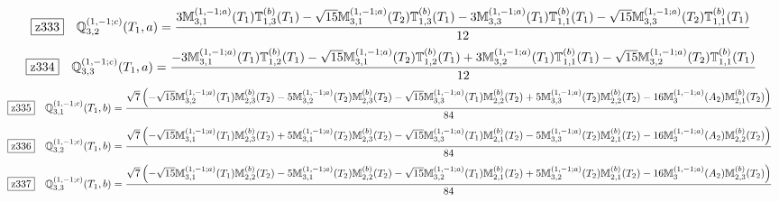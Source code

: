 \documentclass[fleqn,10pt,landscape]{jsarticle}
\begin{document}
\begin{dmath*}
\hspace*{3mm}\fbox{z333}\quad \mathbb{Q}_{3,2}^{(1,-1;c)}(T_{1},a)=\frac{3 \mathbb{M}_{3,1}^{(1,-1;a)}(T_{1}) \mathbb{T}_{1,3}^{(b)}(T_{1}) - \sqrt{15} \mathbb{M}_{3,1}^{(1,-1;a)}(T_{2}) \mathbb{T}_{1,3}^{(b)}(T_{1}) - 3 \mathbb{M}_{3,3}^{(1,-1;a)}(T_{1}) \mathbb{T}_{1,1}^{(b)}(T_{1}) - \sqrt{15} \mathbb{M}_{3,3}^{(1,-1;a)}(T_{2}) \mathbb{T}_{1,1}^{(b)}(T_{1})}{12}
\end{dmath*}
\begin{dmath*}
\hspace*{3mm}\fbox{z334}\quad \mathbb{Q}_{3,3}^{(1,-1;c)}(T_{1},a)=\frac{- 3 \mathbb{M}_{3,1}^{(1,-1;a)}(T_{1}) \mathbb{T}_{1,2}^{(b)}(T_{1}) - \sqrt{15} \mathbb{M}_{3,1}^{(1,-1;a)}(T_{2}) \mathbb{T}_{1,2}^{(b)}(T_{1}) + 3 \mathbb{M}_{3,2}^{(1,-1;a)}(T_{1}) \mathbb{T}_{1,1}^{(b)}(T_{1}) - \sqrt{15} \mathbb{M}_{3,2}^{(1,-1;a)}(T_{2}) \mathbb{T}_{1,1}^{(b)}(T_{1})}{12}
\end{dmath*}
\begin{dmath*}
\hspace*{3mm}\fbox{z335}\quad \mathbb{Q}_{3,1}^{(1,-1;c)}(T_{1},b)=\frac{\sqrt{7} \left(- \sqrt{15} \mathbb{M}_{3,2}^{(1,-1;a)}(T_{1}) \mathbb{M}_{2,3}^{(b)}(T_{2}) - 5 \mathbb{M}_{3,2}^{(1,-1;a)}(T_{2}) \mathbb{M}_{2,3}^{(b)}(T_{2}) - \sqrt{15} \mathbb{M}_{3,3}^{(1,-1;a)}(T_{1}) \mathbb{M}_{2,2}^{(b)}(T_{2}) + 5 \mathbb{M}_{3,3}^{(1,-1;a)}(T_{2}) \mathbb{M}_{2,2}^{(b)}(T_{2}) - 16 \mathbb{M}_{3}^{(1,-1;a)}(A_{2}) \mathbb{M}_{2,1}^{(b)}(T_{2})\right)}{84}
\end{dmath*}
\begin{dmath*}
\hspace*{3mm}\fbox{z336}\quad \mathbb{Q}_{3,2}^{(1,-1;c)}(T_{1},b)=\frac{\sqrt{7} \left(- \sqrt{15} \mathbb{M}_{3,1}^{(1,-1;a)}(T_{1}) \mathbb{M}_{2,3}^{(b)}(T_{2}) + 5 \mathbb{M}_{3,1}^{(1,-1;a)}(T_{2}) \mathbb{M}_{2,3}^{(b)}(T_{2}) - \sqrt{15} \mathbb{M}_{3,3}^{(1,-1;a)}(T_{1}) \mathbb{M}_{2,1}^{(b)}(T_{2}) - 5 \mathbb{M}_{3,3}^{(1,-1;a)}(T_{2}) \mathbb{M}_{2,1}^{(b)}(T_{2}) - 16 \mathbb{M}_{3}^{(1,-1;a)}(A_{2}) \mathbb{M}_{2,2}^{(b)}(T_{2})\right)}{84}
\end{dmath*}
\begin{dmath*}
\hspace*{3mm}\fbox{z337}\quad \mathbb{Q}_{3,3}^{(1,-1;c)}(T_{1},b)=\frac{\sqrt{7} \left(- \sqrt{15} \mathbb{M}_{3,1}^{(1,-1;a)}(T_{1}) \mathbb{M}_{2,2}^{(b)}(T_{2}) - 5 \mathbb{M}_{3,1}^{(1,-1;a)}(T_{2}) \mathbb{M}_{2,2}^{(b)}(T_{2}) - \sqrt{15} \mathbb{M}_{3,2}^{(1,-1;a)}(T_{1}) \mathbb{M}_{2,1}^{(b)}(T_{2}) + 5 \mathbb{M}_{3,2}^{(1,-1;a)}(T_{2}) \mathbb{M}_{2,1}^{(b)}(T_{2}) - 16 \mathbb{M}_{3}^{(1,-1;a)}(A_{2}) \mathbb{M}_{2,3}^{(b)}(T_{2})\right)}{84}
\end{dmath*}
\end{document}
